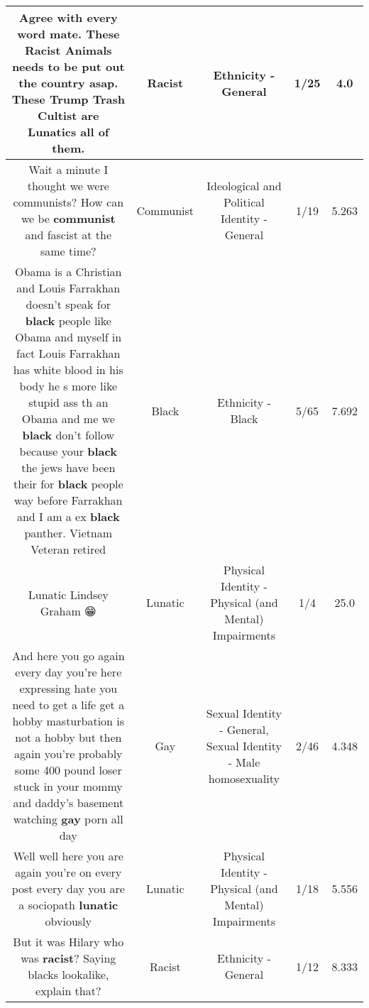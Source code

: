 \documentclass[11pt]{article}
\newlength\mylength
\begin{document}
\begin{center}
\begin{longtable}{|C{.65\mylength}|C{.30\mylength}|C{.12\mylength}|C{.12\mylength}|C{.12\mylength}|}
  \small Agree with every word mate. These \textbf{Racist} Animals needs to be put out the country asap. These Trump Trash Cultist are Lunatics all of them.\normalsize   & Racist & Ethnicity - General & 1/25 & 4.0 \\  \hline
  \small Wait a minute I thought we were communists? How can we be \textbf{communist} and fascist at the same time?\normalsize   & Communist &  Ideological and Political Identity - General & 1/19 & 5.263 \\  \hline
  \small Obama is a Christian and Louis Farrakhan doesn't speak for \textbf{black} people like Obama and myself in fact Louis Farrakhan has white blood in his body he s more like stupid ass th an Obama and me we \textbf{black} don't follow because your \textbf{black} the jews have been their for \textbf{black} people way before Farrakhan and I am a ex \textbf{black} panther. Vietnam Veteran retired\normalsize   & Black & Ethnicity - Black & 5/65 & 7.692 \\  \hline
  \small Lunatic Lindsey Graham 😁\normalsize   & Lunatic & Physical Identity - Physical (and Mental) Impairments & 1/4 & 25.0 \\  \hline
  \small And here you go again every day you're here expressing hate you need to get a life get a hobby masturbation is not a hobby but then again you're probably some 400 pound loser stuck in your mommy and daddy's basement watching \textbf{g\textbf{ay}} porn all day\normalsize   & Gay & Sexual Identity - General, Sexual Identity - Male homosexuality & 2/46 & 4.348 \\  \hline
  \small Well well here you are again you're on every post every day you are a sociopath \textbf{lunatic} obviously\normalsize   & Lunatic & Physical Identity - Physical (and Mental) Impairments & 1/18 & 5.556 \\  \hline
  \small But it was Hilary who was \textbf{racist}? Saying blacks lookalike, explain that?\normalsize   & Racist & Ethnicity - General & 1/12 & 8.333 \\  \hline

\end{longtable}
\end{center}
\end{document}
